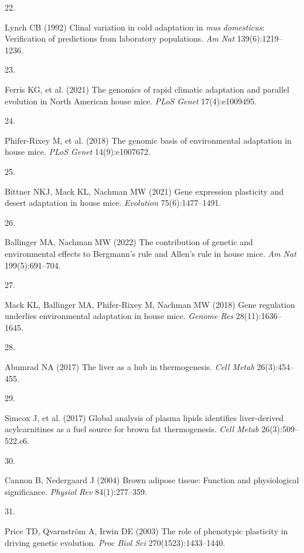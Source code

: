 \documentclass[9pt,twocolumn,twoside,lineno]{pnas-new}
\newlength{\cslhangindent}
\newlength{\csllabelwidth}
\newlength{\cslentryspacingunit} %
\newenvironment{CSLReferences}[2] %
 {%
  \setlength{\parindent}{0pt}
  \ifodd #1
  \let\oldpar\par
  \def\par{\hangindent=\cslhangindent\oldpar}
  \fi
  \setlength{\parskip}{#2\cslentryspacingunit}
 }%
 {}
\newcommand{\CSLLeftMargin}[1]{\parbox[t]{\csllabelwidth}{#1}}
\newcommand{\CSLRightInline}[1]{\parbox[t]{\linewidth - \csllabelwidth}{#1}\break}
\begin{document}
\begin{CSLReferences}{0}{0}
\leavevmode\hypertarget{ref-Lynch1992}{}%
\CSLLeftMargin{22. }
\CSLRightInline{Lynch CB (1992) Clinal variation in cold adaptation in
\emph{mus} \emph{domesticus}: Verification of predictions from
laboratory populations. \emph{Am Nat} 139(6):1219--1236.}

\leavevmode\hypertarget{ref-Ferris2021}{}%
\CSLLeftMargin{23. }
\CSLRightInline{Ferris KG, et al. (2021) The genomics of rapid climatic
adaptation and parallel evolution in {North American} house mice.
\emph{PLoS Genet} 17(4):e1009495.}

\leavevmode\hypertarget{ref-Phifer-Rixey2018}{}%
\CSLLeftMargin{24. }
\CSLRightInline{Phifer-Rixey M, et al. (2018) The genomic basis of
environmental adaptation in house mice. \emph{PLoS Genet}
14(9):e1007672.}

\leavevmode\hypertarget{ref-Bittner2021}{}%
\CSLLeftMargin{25. }
\CSLRightInline{Bittner NKJ, Mack KL, Nachman MW (2021) Gene expression
plasticity and desert adaptation in house mice. \emph{Evolution}
75(6):1477--1491.}

\leavevmode\hypertarget{ref-Ballinger2022}{}%
\CSLLeftMargin{26. }
\CSLRightInline{Ballinger MA, Nachman MW (2022) The contribution of
genetic and environmental effects to {Bergmann's} rule and {Allen's}
rule in house mice. \emph{Am Nat} 199(5):691--704.}

\leavevmode\hypertarget{ref-Mack2018}{}%
\CSLLeftMargin{27. }
\CSLRightInline{Mack KL, Ballinger MA, Phifer-Rixey M, Nachman MW (2018)
Gene regulation underlies environmental adaptation in house mice.
\emph{Genome Res} 28(11):1636--1645.}

\leavevmode\hypertarget{ref-Abumrad2017}{}%
\CSLLeftMargin{28. }
\CSLRightInline{Abumrad NA (2017) The liver as a hub in thermogenesis.
\emph{Cell Metab} 26(3):454--455.}

\leavevmode\hypertarget{ref-Simcox2017}{}%
\CSLLeftMargin{29. }
\CSLRightInline{Simcox J, et al. (2017) Global analysis of plasma lipids
identifies {liver-derived} acylcarnitines as a fuel source for brown fat
thermogenesis. \emph{Cell Metab} 26(3):509--522.e6.}

\leavevmode\hypertarget{ref-Cannon2004}{}%
\CSLLeftMargin{30. }
\CSLRightInline{Cannon B, Nedergaard J (2004) Brown adipose tissue:
Function and physiological significance. \emph{Physiol Rev}
84(1):277--359.}

\leavevmode\hypertarget{ref-Price2003}{}%
\CSLLeftMargin{31. }
\CSLRightInline{Price TD, Qvarnström A, Irwin DE (2003) The role of
phenotypic plasticity in driving genetic evolution. \emph{Proc Biol Sci}
270(1523):1433--1440.}


\end{CSLReferences}
\end{document}
